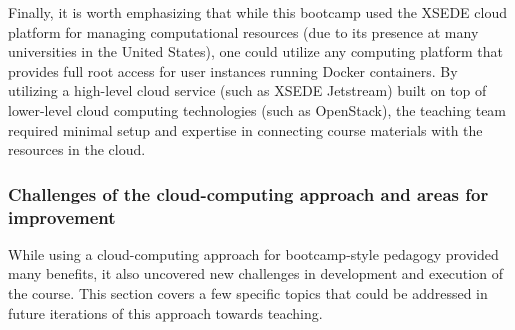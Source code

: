 Finally, it is worth emphasizing that while this bootcamp used
the XSEDE cloud platform for managing computational resources (due to its
presence at many universities in the United States),
one could utilize any computing platform that provides full root access for user instances
running Docker containers. By utilizing a high-level cloud service (such as XSEDE Jetstream) built on
top of lower-level cloud computing technologies (such as OpenStack), the
teaching team required
minimal setup and expertise in connecting course materials with the resources in the cloud.

\subsubsection{Challenges of the cloud-computing approach and areas for improvement}

While using a cloud-computing approach for bootcamp-style pedagogy provided many
benefits, it also uncovered new challenges in development and execution of the
course. This section covers a few specific topics that could be addressed in
future iterations of this approach towards teaching.

